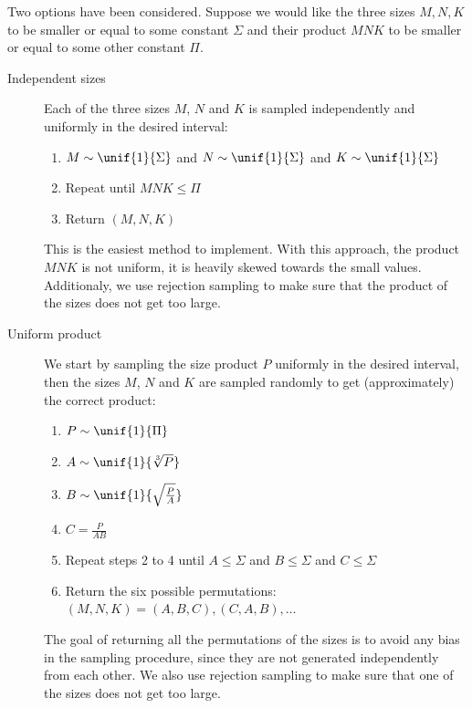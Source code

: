            Two options have been considered. Suppose we would like the three sizes \(M,N,K\) to be smaller or equal to
            some constant \(\Sigma\) and their product \(MNK\) to be smaller or equal to some other constant \(\Pi\).
            \begin{description}
                \item[Independent sizes] Each of the three sizes \(M\), \(N\) and \(K\) is sampled independently and
                    uniformly in the desired interval:
                    \begin{enumerate}
                        \item \(M \sim \unif{1}{\Sigma}\) and \(N \sim \unif{1}{\Sigma}\) and
                            \(K \sim \unif{1}{\Sigma}\)
                        \item Repeat until \(MNK \leq \Pi\)
                        \item Return \((M,N,K)\)
                    \end{enumerate}
                    This is the easiest method to implement. With this approach, the product
                    \(MNK\) is not uniform, it is heavily skewed towards the small values. Additionaly, we use rejection
                    sampling to make sure that the product of the sizes does not get too large.
                \item[Uniform product] We start by sampling the size product \(P\) uniformly in the desired interval,
                    then the sizes \(M\), \(N\) and \(K\) are sampled randomly to get (approximately) the correct
                    product:
                    \begin{enumerate}
                        \item \(P \sim \unif{1}{\Pi}\)
                        \item \(A \sim \unif{1}{\sqrt[3]{P}}\)
                        \item \(B \sim \unif{1}{\sqrt{\frac{P}{A}}}\)
                        \item \(C = \frac{P}{AB}\)
                        \item Repeat steps 2 to 4 until \(A \leq \Sigma\) and \(B \leq \Sigma\) and \(C \leq \Sigma\)
                        \item Return the six possible permutations: \((M,N,K) = (A,B,C), (C,A,B), \dots\)
                    \end{enumerate}
                    The goal of returning all the permutations of the sizes is to avoid any bias in the sampling
                    procedure, since they are not generated independently from each other. We also use rejection
                    sampling to make sure that one of the sizes does not get too large.
            \end{description}

